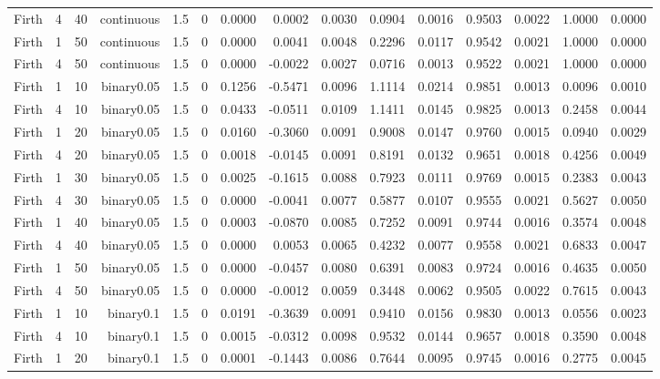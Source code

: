 \begin{longtable}{rrrrrrrrrrrrrrr}
  Firth & 4 & 40 & continuous & 1.5 & 0 & 0.0000 & 0.0002 & 0.0030 & 0.0904 & 0.0016 & 0.9503 & 0.0022 & 1.0000 & 0.0000 \\ 
  Firth & 1 & 50 & continuous & 1.5 & 0 & 0.0000 & 0.0041 & 0.0048 & 0.2296 & 0.0117 & 0.9542 & 0.0021 & 1.0000 & 0.0000 \\ 
  Firth & 4 & 50 & continuous & 1.5 & 0 & 0.0000 & -0.0022 & 0.0027 & 0.0716 & 0.0013 & 0.9522 & 0.0021 & 1.0000 & 0.0000 \\ 
  Firth & 1 & 10 & binary0.05 & 1.5 & 0 & 0.1256 & -0.5471 & 0.0096 & 1.1114 & 0.0214 & 0.9851 & 0.0013 & 0.0096 & 0.0010 \\ 
  Firth & 4 & 10 & binary0.05 & 1.5 & 0 & 0.0433 & -0.0511 & 0.0109 & 1.1411 & 0.0145 & 0.9825 & 0.0013 & 0.2458 & 0.0044 \\ 
  Firth & 1 & 20 & binary0.05 & 1.5 & 0 & 0.0160 & -0.3060 & 0.0091 & 0.9008 & 0.0147 & 0.9760 & 0.0015 & 0.0940 & 0.0029 \\ 
  Firth & 4 & 20 & binary0.05 & 1.5 & 0 & 0.0018 & -0.0145 & 0.0091 & 0.8191 & 0.0132 & 0.9651 & 0.0018 & 0.4256 & 0.0049 \\ 
  Firth & 1 & 30 & binary0.05 & 1.5 & 0 & 0.0025 & -0.1615 & 0.0088 & 0.7923 & 0.0111 & 0.9769 & 0.0015 & 0.2383 & 0.0043 \\ 
  Firth & 4 & 30 & binary0.05 & 1.5 & 0 & 0.0000 & -0.0041 & 0.0077 & 0.5877 & 0.0107 & 0.9555 & 0.0021 & 0.5627 & 0.0050 \\ 
  Firth & 1 & 40 & binary0.05 & 1.5 & 0 & 0.0003 & -0.0870 & 0.0085 & 0.7252 & 0.0091 & 0.9744 & 0.0016 & 0.3574 & 0.0048 \\ 
  Firth & 4 & 40 & binary0.05 & 1.5 & 0 & 0.0000 & 0.0053 & 0.0065 & 0.4232 & 0.0077 & 0.9558 & 0.0021 & 0.6833 & 0.0047 \\ 
  Firth & 1 & 50 & binary0.05 & 1.5 & 0 & 0.0000 & -0.0457 & 0.0080 & 0.6391 & 0.0083 & 0.9724 & 0.0016 & 0.4635 & 0.0050 \\ 
  Firth & 4 & 50 & binary0.05 & 1.5 & 0 & 0.0000 & -0.0012 & 0.0059 & 0.3448 & 0.0062 & 0.9505 & 0.0022 & 0.7615 & 0.0043 \\ 
  Firth & 1 & 10 & binary0.1 & 1.5 & 0 & 0.0191 & -0.3639 & 0.0091 & 0.9410 & 0.0156 & 0.9830 & 0.0013 & 0.0556 & 0.0023 \\ 
  Firth & 4 & 10 & binary0.1 & 1.5 & 0 & 0.0015 & -0.0312 & 0.0098 & 0.9532 & 0.0144 & 0.9657 & 0.0018 & 0.3590 & 0.0048 \\ 
  Firth & 1 & 20 & binary0.1 & 1.5 & 0 & 0.0001 & -0.1443 & 0.0086 & 0.7644 & 0.0095 & 0.9745 & 0.0016 & 0.2775 & 0.0045 \\ 

\end{longtable}
